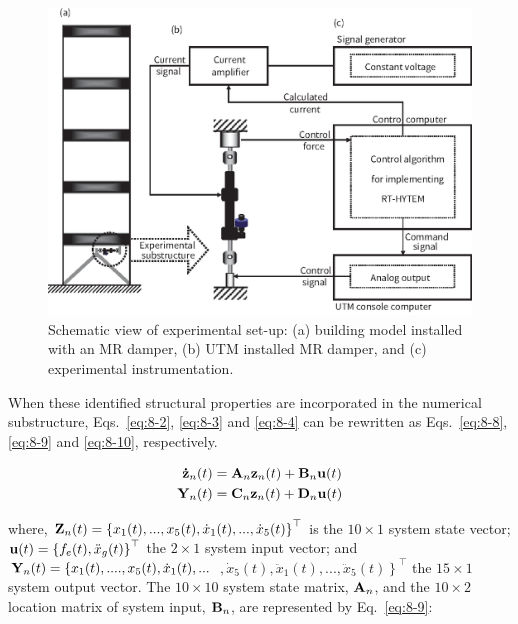 \begin{figure}[ht]
\centering
\includegraphics[width=1\textwidth] {figure/8-3.eps}
\caption{Schematic view of experimental set-up: (a) building model installed with an MR damper, (b) UTM installed MR damper, and (c) experimental instrumentation.}
\label{fig:8-3}
\end{figure}


When these identified structural properties are incorporated in the numerical substructure, Eqs.~\eqref{eq:8-2}, \eqref{eq:8-3} and \eqref{eq:8-4} can be rewritten as Eqs.~\eqref{eq:8-8}, \eqref{eq:8-9} and \eqref{eq:8-10}, respectively.

\begin{equation}\label{eq:8-8}
\begin{aligned}
\mathbf{\dot{z}}_{n}(t) & = \mathbf{A}_{n}\mathbf{z}_{n}(t) + \mathbf{B}_{n}\mathbf{u}(t) \\
\mathbf{Y}_{n}(t) & = \mathbf{C}_{n}\mathbf{z}_{n}(t) + \mathbf{D}_{n}\mathbf{u}(t)
\end{aligned}
\end{equation}

where, $\mathbf{Z}_{n}(t) = \left\{ x_{1}(t),...,x_{5}(t),\dot{x}_{1}(t),...,\dot{x}_{5}(t)\right\}^{\top}$ is the $10\times1$ system state vector; $\mathbf{u}(t)=\left\{f_{e}(t), \ddot{x}_{g}(t)\right\}^{\top}$ the $2\times1$ system input vector; and $\mathbf{Y}_{n}(t) = \left\{x_{1}(t),....,x_{5}(t),\dot{x}_{1}(t),...\right.$ $\left.,\dot{x}_{5}(t),\ddot{x}_{1}(t),...,\ddot{x}_{5}(t)\right\}^{\top}$ the $15\times1$ system output vector. The $10\times10$ system state matrix, $\mathbf{A}_{n}$, and the $10\times2$ location matrix of system input, $\mathbf{B}_{n}$, are represented by Eq.~\eqref{eq:8-9}:

